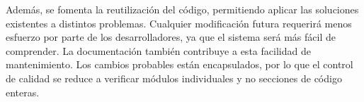 Además, se fomenta la reutilización del código, permitiendo aplicar las soluciones existentes a distintos problemas. Cualquier modificación futura requerirá menos esfuerzo por parte de los desarrolladores, ya que el sistema será más fácil de comprender. La documentación también contribuye a esta facilidad de mantenimiento. Los cambios probables están encapsulados, por lo que el control de calidad se reduce a verificar módulos individuales y no secciones de código enteras.

